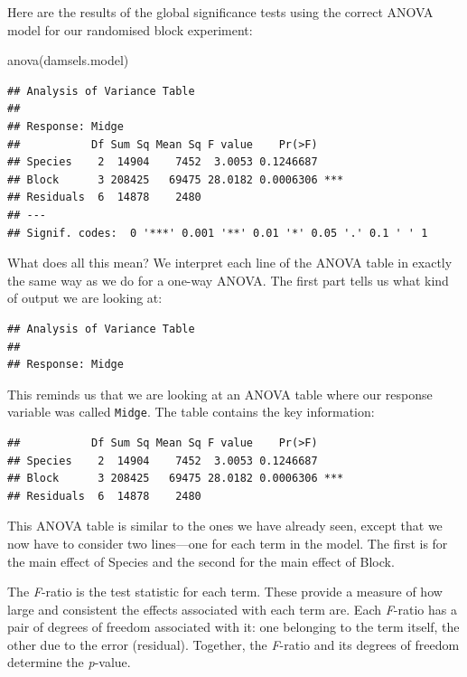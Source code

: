 \documentclass[
]{book}
\newenvironment{Shaded}{\begin{snugshade}}{\end{snugshade}}
\newcommand{\FunctionTok}[1]{\textcolor[rgb]{0.00,0.00,0.00}{#1}}
\newcommand{\NormalTok}[1]{#1}
\begin{document}
Here are the results of the global significance tests using the correct ANOVA model for our randomised block experiment:

\begin{Shaded}
\begin{Highlighting}[]
\FunctionTok{anova}\NormalTok{(damsels.model)}
\end{Highlighting}
\end{Shaded}

\begin{verbatim}
## Analysis of Variance Table
## 
## Response: Midge
##           Df Sum Sq Mean Sq F value    Pr(>F)    
## Species    2  14904    7452  3.0053 0.1246687    
## Block      3 208425   69475 28.0182 0.0006306 ***
## Residuals  6  14878    2480                      
## ---
## Signif. codes:  0 '***' 0.001 '**' 0.01 '*' 0.05 '.' 0.1 ' ' 1
\end{verbatim}

What does all this mean? We interpret each line of the ANOVA table in exactly the same way as we do for a one-way ANOVA. The first part tells us what kind of output we are looking at:

\begin{verbatim}
## Analysis of Variance Table 
##  
## Response: Midge
\end{verbatim}

This reminds us that we are looking at an ANOVA table where our response variable was called \texttt{Midge}. The table contains the key information:

\begin{verbatim}
##           Df Sum Sq Mean Sq F value    Pr(>F)     
## Species    2  14904    7452  3.0053 0.1246687     
## Block      3 208425   69475 28.0182 0.0006306 *** 
## Residuals  6  14878    2480
\end{verbatim}

This ANOVA table is similar to the ones we have already seen, except that we now have to consider two lines---one for each term in the model. The first is for the main effect of Species and the second for the main effect of Block.

The \emph{F}-ratio is the test statistic for each term. These provide a measure of how large and consistent the effects associated with each term are. Each \emph{F}-ratio has a pair of degrees of freedom associated with it: one belonging to the term itself, the other due to the error (residual). Together, the \emph{F}-ratio and its degrees of freedom determine the \emph{p}-value.
\end{document}

